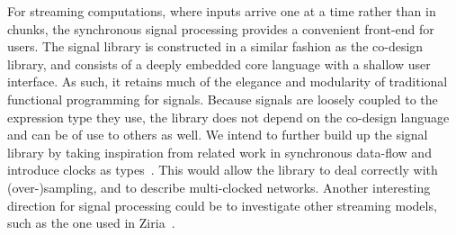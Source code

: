 \documentclass[../paper.tex]{subfiles}
\begin{document}
For streaming computations, where inputs arrive one at a time rather than in chunks, the synchronous signal processing provides a convenient front-end for users. The signal library is constructed in a similar fashion as the co-design library, and consists of a deeply embedded core language with a shallow user interface. As such, it retains much of the elegance and modularity of traditional functional programming for signals. Because signals are loosely coupled to the expression type they use, the library does not depend on the co-design language and can be of use to others as well. We intend to further build up the signal library by taking inspiration from related work in synchronous data-flow and introduce clocks as types~\cite{lucy2008}. This would allow the library to deal correctly with (over-)sampling, and to describe multi-clocked networks. Another interesting direction for signal processing could be to investigate other streaming models, such as the one used in Ziria~\cite{ziria2015, fudgets1993}.
\end{document}
